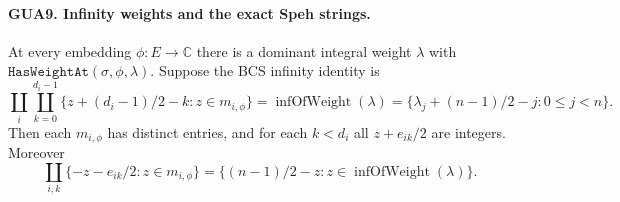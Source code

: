 \paragraph{GUA9. Infinity weights and the exact Speh strings.}
\label{claim:GUA9}
At every embedding $\phi:E\to\mathbb C$ there is a
dominant integral weight $\lambda$ with
$\texttt{HasWeightAt}(\sigma,\phi,\lambda)$.  Suppose
the BCS infinity identity is
\[
 \coprod_i\coprod_{k=0}^{d_i-1}
       \{z+(d_i-1)/2-k:z\in m_{i,\phi}\}
     =\operatorname{infOfWeight}(\lambda)
     =\{\lambda_j+(n-1)/2-j:0\leq j<n\}.           \tag{GUA.15}
\]
Then each $m_{i,\phi}$ has distinct entries, and for
each $k<d_i$ all $z+e_{ik}/2$ are integers.  Moreover
\[
 \coprod_{i,k}\{-z-e_{ik}/2:z\in m_{i,\phi}\}
   =\{(n-1)/2-z:z\in\operatorname{infOfWeight}(\lambda)\}.
                                                        \tag{GUA.16}
\]
